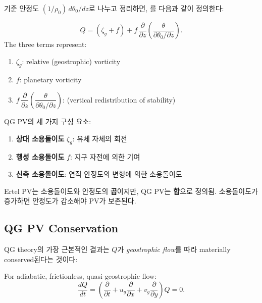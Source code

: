 \noindent
기준 안정도 $(1/\rho_0)\,d\theta_0/dz$로 나누고 정리하면,
를 다음과 같이 정의한다:

\begin{definition}
\begin{equation}\label{eq:qgpv-z}
  \boxed{
  Q = (\zeta_g + f) + f\,\frac{\partial}{\partial z}
      \left(\frac{\theta}{\partial\theta_0/\partial z}\right).
  }
\end{equation}
The three terms represent:
\begin{enumerate}
  \item $\zeta_g$: relative (geostrophic) vorticity
  \item $f$: planetary vorticity
  \item $f\,\dfrac{\partial}{\partial z}\!\left(\dfrac{\theta}
        {\partial\theta_0/\partial z}\right)$:
         (vertical redistribution of stability)
\end{enumerate}
\end{definition}

\begin{hisublock}
QG PV의 세 가지 구성 요소:
\begin{enumerate}
  \item \textbf{상대 소용돌이도} $\zeta_g$: 유체 자체의 회전
  \item \textbf{행성 소용돌이도} $f$: 지구 자전에 의한 기여
  \item \textbf{신축 소용돌이도}: 연직 안정도의 변형에 의한 소용돌이도
\end{enumerate}
Ertel PV는 소용돌이도와 안정도의 \textbf{곱}이지만,
QG PV는 \textbf{합}으로 정의됨.
소용돌이도가 증가하면 안정도가 감소해야 PV가 보존된다.
\end{hisublock}

\subsection{QG PV Conservation}\label{subsec:qgpv-conserve}

QG theory의 가장 근본적인 결과는 $Q$가 \emph{geostrophic flow}를 따라
materially conserved된다는 것이다:

\begin{theorem}[Conservation of QG PV]
For adiabatic, frictionless, quasi-geostrophic flow:
\begin{equation}\label{eq:qgpv-conserve}
  \boxed{
  \frac{dQ}{dt}
  = \left(\frac{\partial}{\partial t}
    + u_g\frac{\partial}{\partial x}
    + v_g\frac{\partial}{\partial y}\right) Q = 0.
  }
\end{equation}
\end{theorem}

